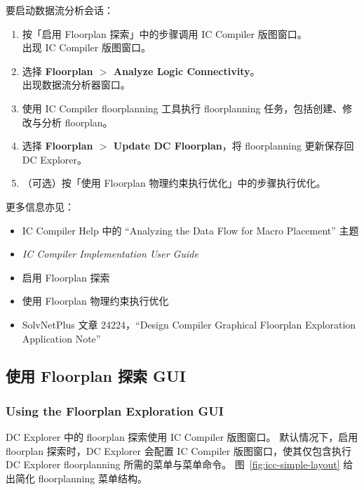 要启动数据流分析会话：
\begin{enumerate}
  \item 按「启用 Floorplan 探索」中的步骤调用 IC Compiler 版图窗口。\\
        出现 IC Compiler 版图窗口。
  \item 选择 \textbf{Floorplan $>$ Analyze Logic Connectivity}。\\
        出现数据流分析器窗口。
  \item 使用 IC Compiler floorplanning 工具执行 floorplanning 任务，包括创建、修改与分析 floorplan。
  \item 选择 \textbf{Floorplan $>$ Update DC Floorplan}，将 floorplanning 更新保存回 DC Explorer。
  \item （可选）按「使用 Floorplan 物理约束执行优化」中的步骤执行优化。
\end{enumerate}

更多信息亦见：
\begin{itemize}
  \item IC Compiler Help 中的 ``Analyzing the Data Flow for Macro Placement'' 主题
  \item \textit{IC Compiler Implementation User Guide}
\end{itemize}

\begin{seeAlsoBox}
\begin{itemize}
  \item 启用 Floorplan 探索
  \item 使用 Floorplan 物理约束执行优化
  \item SolvNetPlus 文章 24224，``Design Compiler Graphical Floorplan Exploration Application Note''
\end{itemize}
\end{seeAlsoBox}

\subsection{使用 Floorplan 探索 GUI}
\subsubsection*{Using the Floorplan Exploration GUI}

DC Explorer 中的 floorplan 探索使用 IC Compiler 版图窗口。
默认情况下，启用 floorplan 探索时，DC Explorer 会配置 IC Compiler 版图窗口，使其仅包含执行 DC Explorer floorplanning 所需的菜单与菜单命令。
图~\ref{fig:icc-simple-layout} 给出简化 floorplanning 菜单结构。

